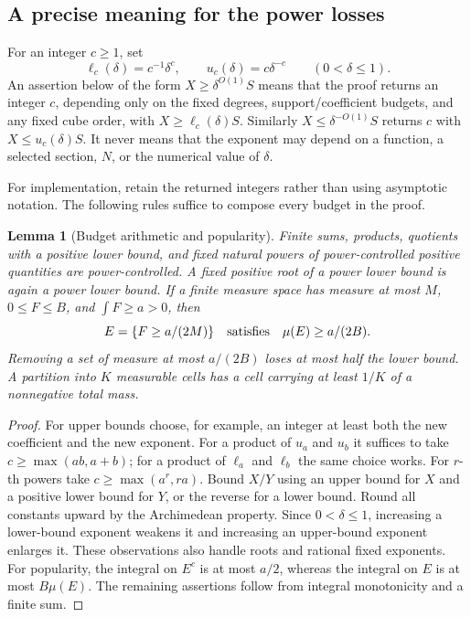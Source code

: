 \documentclass[11pt]{article}
\newtheorem{lemma}[lemma]{Lemma}
\theoremstyle{definition}
\begin{document}
\subsection{A precise meaning for the power losses}
For an integer $c\geq1$, set
\[
 \ell_c(\delta)=c^{-1}\delta^c,\qquad u_c(\delta)=c\delta^{-c}
 \qquad(0<\delta\leq1).
\]
An assertion below of the form $X\geq\delta^{O(1)}S$ means that the proof returns an integer
$c$, depending only on the fixed degrees, support/coefficient budgets, and any fixed cube order,
with $X\geq\ell_c(\delta)S$.  Similarly $X\leq\delta^{-O(1)}S$ returns $c$ with
$X\leq u_c(\delta)S$.  It never means that the exponent may depend on a function, a selected
section, $N$, or the numerical value of $\delta$.

For implementation, retain the returned integers rather than using asymptotic notation.
The following rules suffice to compose every budget in the proof.
\begin{lemma}[Budget arithmetic and popularity]\label{patch:budgets}
Finite sums, products, quotients with a positive lower bound, and fixed natural powers of
power-controlled positive quantities are power-controlled.  A fixed positive root of a
power lower bound is again a power lower bound.  If a finite measure space has measure at most
$M$, $0\leq F\leq B$, and $\int F\geq a>0$, then
\[
 E=\{F\geq a/(2M)\}\quad\hbox{satisfies}\quad \mu(E)\geq a/(2B).
\]
Removing a set of measure at most $a/(2B)$ loses at most half the lower bound.  A partition
into $K$ measurable cells has a cell carrying at least $1/K$ of a nonnegative total mass.
\end{lemma}
\begin{proof}
For upper bounds choose, for example, an integer at least both the new coefficient and the
new exponent.  For a product of $u_a$ and $u_b$ it suffices to take
$c\geq\max(ab,a+b)$; for a product of $\ell_a$ and $\ell_b$ the same choice works.
For $r$-th powers take $c\geq\max(a^r,ra)$.  Bound $X/Y$ using an upper bound for $X$
and a positive lower bound for $Y$, or the reverse for a lower bound.  Round all constants
upward by the Archimedean property.  Since $0<\delta\leq1$, increasing a lower-bound exponent
weakens it and increasing an upper-bound exponent enlarges it.  These observations also
handle roots and rational fixed exponents.
For popularity, the integral on $E^c$ is at most $a/2$, whereas the integral on $E$ is at most
$B\mu(E)$.  The remaining assertions follow from integral monotonicity and a finite sum.
\end{proof}
\end{document}
